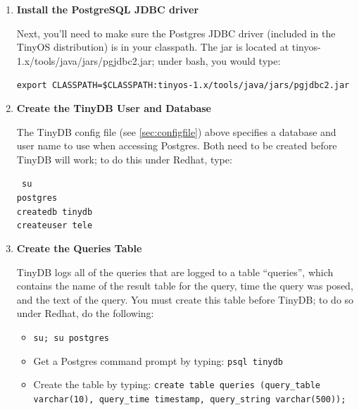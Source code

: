 \documentclass[11pt]{article}
\newcommand{\java}{tinyos-1.x/tools/java}
\begin{document}
\begin{enumerate}
On some Redhat installations, you may also need to enable connections from localhost (e.g. IP address 127.0.0.1).  To do this:

\begin{itemize}
\item Edit {\tt pg\_hba.conf} by
adding the following line to the end of the file: \\

{\tt \#tcpip\_socket = false} \\
with \\
{\tt tcpip\_socket = true} \\
\item Restart the postgresql server (under Redhat, type {\tt /etc/rc.d/init.d/postgresql restart})
\end{itemize}



\item{\bf Install the PostgreSQL JDBC driver}

Next, you'll need to make sure the Postgres JDBC driver (included in the TinyOS distribution) is in your classpath.  The
jar is located at \java/jars/pgjdbc2.jar;  under bash, you would type:

{\tt export CLASSPATH=\$CLASSPATH:\java/jars/pgjdbc2.jar}

\item{\bf Create the TinyDB User and Database}

The TinyDB config file (see \ref{sec:configfile}) above specifies a database and user name to use when accessing 
Postgres.  Both need to be created before TinyDB will work;  to do this under Redhat, type:

{\tt
su \\
postgres \\
createdb tinydb \\
createuser tele \\
}

\item{\bf Create the Queries Table}

TinyDB logs all of the queries that are logged to a table ``queries'', which contains the name of the result table
for the query,  time
the query was posed, and the text of the query.  You must create this table before TinyDB;
to do so under Redhat, do the following:

\begin{itemize}
\item {\tt su; su postgres}
\item Get a Postgres command prompt by typing: {\tt psql tinydb}
\item Create the table by typing: {\tt create table queries (query\_table varchar(10), query\_time timestamp, query\_string varchar(500));}
\end{itemize}
\end{enumerate}
\end{document}
